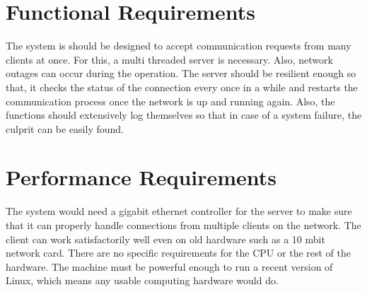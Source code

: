 \section{Functional Requirements}
The system is should be designed to accept communication requests from many
clients at once. For this, a multi threaded server is necessary. Also, network
outages can occur during the operation. The server should be resilient enough
so that, it checks the status of the connection every once in a while and
restarts the communication process once the network is up and running again.
Also, the functions should extensively log themselves so that in case of a
system failure, the culprit can be easily found.

\section{Performance Requirements}
The system would need a gigabit ethernet controller for the server to make sure
that it can properly handle connections from multiple clients on the network.
The client can work satisfactorily well even on old hardware such as a 10 mbit
network card. There are no specific requirements for the CPU or the rest of the
hardware. The machine must be powerful enough to run a recent version of Linux,
which means any usable computing hardware would do.

